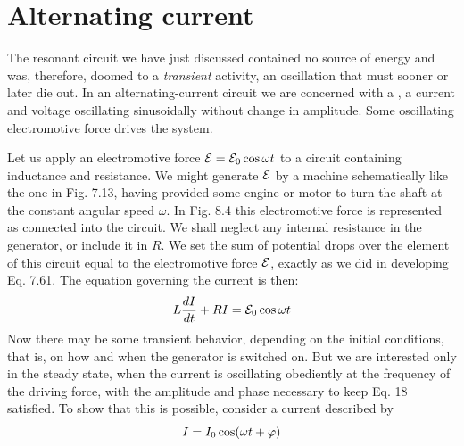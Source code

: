 \section{Alternating current}

The resonant circuit we have just discussed contained no source
of energy and was, therefore, doomed to a \emph{transient}
activity, an
oscillation that must sooner or later die out. In an 
alternating-current circuit we are concerned with a , a current and
voltage oscillating sinusoidally without change in amplitude. Some
oscillating electromotive force drives the system.

Let us apply an electromotive force $\mathcal{E} = \mathcal{E}_0 \cos \omega t$ to a circuit containing
inductance and resistance. We might generate $\mathcal{E}$ by a
machine schematically like the one in Fig. 7.13, having provided
some engine or motor to turn the shaft at the constant angular
speed $\omega$. In Fig. 8.4 this electromotive force is represented as connected
into the circuit. We shall neglect any internal resistance in
the generator, or include it in $R$. We set the sum of potential drops
over the element of this circuit equal to the electromotive force $\mathcal{E}$,
exactly as we did in developing Eq. 7.61. The equation governing
the current is then:
\begin{equation}
  L\frac{\mathop{d\!} I}{\mathop{d\!} t} + RI = \mathcal{E}_0\cos\omega t
\end{equation}
Now there may be some transient behavior, depending on the
initial conditions, that is, on how and when the generator is switched
on. But we are interested only in the steady state, when the current
is oscillating obediently at the frequency of the driving force, with
the amplitude and phase necessary to keep Eq. 18 satisfied. To show
that this is possible, consider a current described by
\begin{equation}
  I = I_0 \cos (\omega t + \varphi)
\end{equation}

